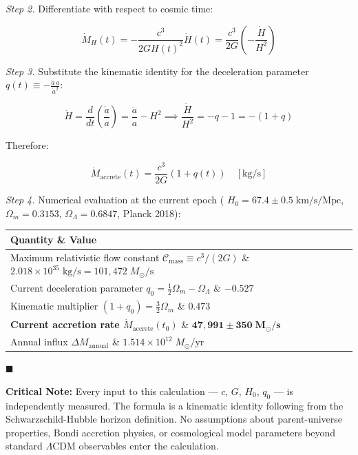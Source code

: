 \documentclass[11pt,a4paper]{article}
\theoremstyle{definition}\newtheorem{definition}{Definition}
\theoremstyle{remark}\newtheorem{remark}{Remark}
\begin{document}
\textit{Step 2.} Differentiate with respect to cosmic time:


\begin{equation}
\dot{M}_H(t) = -\frac{c^3}{2 G H(t)^2} \dot{H}(t) = \frac{c^3}{2G}\left(-\frac{\dot{H}}{H^2}\right)
\end{equation}


\textit{Step 3.} Substitute the kinematic identity for the deceleration parameter $q(t) \equiv -\frac{\ddot{a} \, a}{\dot{a}^2}$:


\begin{equation}
\dot{H} = \frac{d}{dt}\left(\frac{\dot{a}}{a}\right) = \frac{\ddot{a}}{a} - H^2 \implies \frac{\dot{H}}{H^2} = -q - 1 = -(1+q)
\end{equation}


Therefore:


\begin{equation}
\boxed{\dot{M}_{\text{accrete}}(t) = \frac{c^3}{2G}(1 + q(t)) \quad [\mathrm{kg/s}]}
\end{equation}


\textit{Step 4.} Numerical evaluation at the current epoch ( $H_0 = 67.4 \pm 0.5 \; \mathrm{km/s/Mpc}$, $\Omega_m = 0.3153$, $\Omega_\Lambda = 0.6847$, Planck 2018):

\begin{longtable}{ll}
\hline
Quantity \& Value \\
\hline
Maximum relativistic flow constant $\mathcal{C}_{\text{mass}} \equiv c^3/(2G)$ \& $2.018 \times 10^{35} \; \mathrm{kg/s} = 101{,}472 \; M_\odot/\mathrm{s}$ \\
Current deceleration parameter $q_0 = \tfrac{1}{2}\Omega_m - \Omega_\Lambda$ \& $-0.527$ \\
Kinematic multiplier $(1 + q_0) = \tfrac{3}{2}\Omega_m$ \& $0.473$ \\
\textbf{Current accretion rate $\dot{M}_{\text{accrete}}(t_0)$} \& $\mathbf{47{,}991 \pm 350 \; M_\odot/\text{s}}$ \\
Annual influx $\Delta M_{\text{annual}}$ \& $1.514 \times 10^{12} \; M_\odot/\text{yr}$ \\
\hline
\end{longtable}
$\blacksquare$

\textbf{Critical Note:} Every input to this calculation — $c$, $G$, $H_0$, $q_0$ — is independently measured. The formula is a kinematic identity following from the Schwarzschild-Hubble horizon definition. No assumptions about parent-universe properties, Bondi accretion physics, or cosmological model parameters beyond standard $\Lambda$CDM observables enter the calculation.
\end{document}
